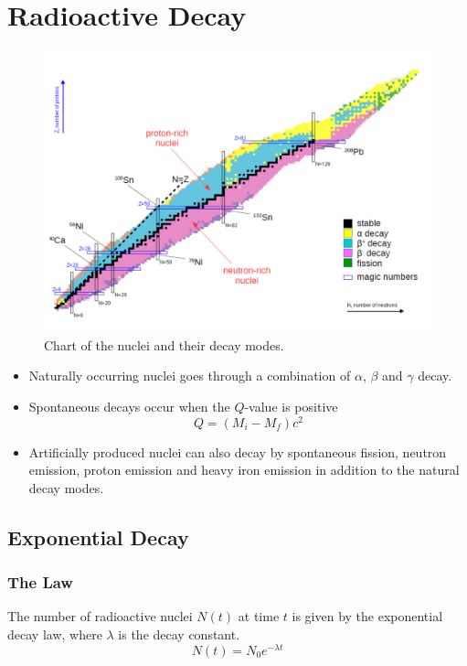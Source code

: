 \section{Radioactive Decay}
\begin{figure}[ht!]
\centering
\includegraphics[width = .8\textwidth]{radioactive_nuclei_chart.png}
\caption{Chart of the nuclei and their decay modes.}
\label{fig: radioactive_nuclei_chart}
\end{figure}

\begin{itemize}
    \item Naturally occurring nuclei goes through a combination of $α$, $β$ and $γ$ decay.
    \item Spontaneous decays occur when the $Q$-value is positive 
    \begin{equation}
      Q = (M_i - M_f)c^2
    \end{equation}
    \item Artificially produced nuclei can also decay by spontaneous fission, neutron emission, proton emission and heavy iron emission in addition to the natural decay modes.
\end{itemize}

\subsection{Exponential Decay}
\subsubsection{The Law}
The number of radioactive nuclei $N(t)$ at time $t$ is given by the exponential decay law, where $λ$ is the decay constant. 
\begin{equation}
  N(t) = N_0 e^{-λt}
\end{equation}

